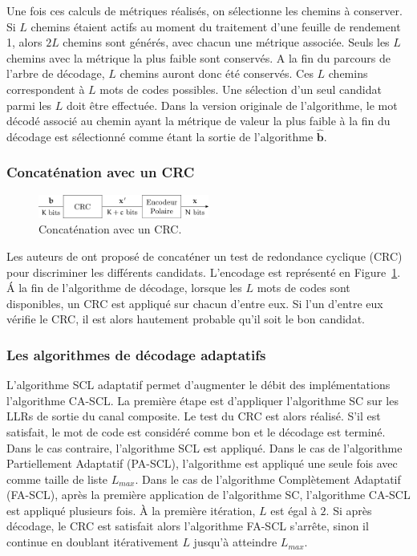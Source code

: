 Une fois ces calculs de métriques réalisés, on sélectionne les chemins à conserver. Si $L$ chemins étaient actifs au moment du traitement d'une feuille de rendement 1, alors $2L$ chemins sont générés, avec chacun une métrique associée. Seuls les $L$ chemins avec la métrique la plus faible sont conservés. A la fin du parcours de l'arbre de décodage, $L$ chemins auront donc été conservés. Ces $L$ chemins correspondent à $L$ mots de codes possibles. Une sélection d'un seul candidat parmi les $L$ doit être effectuée. Dans la version originale de l'algorithme, le mot décodé associé au chemin ayant la métrique de valeur la plus faible à la fin du décodage est sélectionné comme étant la sortie de l'algorithme $\mathbold{\hat{b}}$.



\subsubsection{Concaténation avec un CRC}
\begin{figure}[t]
\centering
\includegraphics[width=0.5\textwidth]{main/ch1_fig/crc}
\caption{Concaténation avec un CRC.}
\label{fig:crc}
\end{figure}
Les auteurs de \cite{tal_how_2013} ont proposé de concaténer un test de redondance cyclique (CRC) pour discriminer les différents candidats. L'encodage est représenté en Figure~\ref{fig:crc}. \'A la fin de l'algorithme de décodage, lorsque les $L$ mots de codes sont disponibles, un CRC est appliqué sur chacun d'entre eux. Si l'un d'entre eux vérifie le CRC, il est alors hautement probable qu'il soit le bon candidat.

\subsubsection{Les algorithmes de décodage adaptatifs}

L'algorithme SCL adaptatif permet d'augmenter le débit des implémentations l'algorithme CA-SCL. La première étape est d'appliquer l'algorithme SC sur les LLRs de sortie du canal composite. Le test du CRC est alors réalisé. S'il est satisfait, le mot de code est considéré comme bon et le décodage est terminé. Dans le cas contraire, l'algorithme SCL est appliqué. Dans le cas de l'algorithme Partiellement Adaptatif (PA-SCL), l'algorithme est appliqué une seule fois avec comme taille de liste $L_{max}$. Dans le cas de l'algorithme Complètement Adaptatif (FA-SCL), après la première application de l'algorithme SC, l'algorithme CA-SCL est appliqué plusieurs fois. \`A la première itération, $L$ est égal à $2$. Si après décodage, le CRC est satisfait alors l'algorithme FA-SCL s'arrête, sinon il continue en doublant itérativement $L$ jusqu'à atteindre $L_{max}$.

